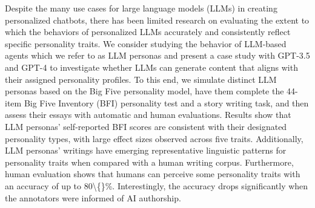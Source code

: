 Despite the many use cases for large language models (LLMs) in creating personalized chatbots, there has been limited research on evaluating the extent to which the behaviors of personalized LLMs accurately and consistently reflect specific personality traits. We consider studying the behavior of LLM-based agents which we refer to as LLM personas and present a case study with GPT-3.5 and GPT-4 to investigate whether LLMs can generate content that aligns with their assigned personality profiles. To this end, we simulate distinct LLM personas based on the Big Five personality model, have them complete the 44-item Big Five Inventory (BFI) personality test and a story writing task, and then assess their essays with automatic and human evaluations. Results show that LLM personas' self-reported BFI scores are consistent with their designated personality types, with large effect sizes observed across five traits. Additionally, LLM personas' writings have emerging representative linguistic patterns for personality traits when compared with a human writing corpus. Furthermore, human evaluation shows that humans can perceive some personality traits with an accuracy of up to 80\textbackslash\{\}\%. Interestingly, the accuracy drops significantly when the annotators were informed of AI authorship.